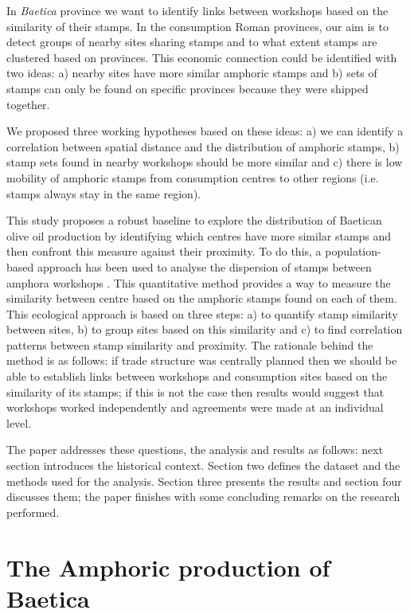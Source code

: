 In \textit{Baetica} province we want to identify links between workshops based on the similarity of their stamps. In the consumption Roman provinces, our aim is to detect groups of nearby sites sharing stamps and to what extent stamps are clustered based on provinces. This economic connection could be identified with two ideas: a) nearby sites have more similar amphoric stamps and b) sets of stamps can only be found on specific provinces because they were shipped together.

We proposed three working hypotheses based on these ideas: a) we can identify a correlation between spatial distance and the distribution of amphoric stamps, b) stamp sets found in nearby workshops should be more similar and c) there is low mobility of amphoric stamps from consumption centres to other regions (i.e. stamps always stay in the same region).

This study proposes a robust baseline to explore the distribution of Baetican olive oil production by identifying which centres have more similar stamps and then confront this measure against their proximity. To do this, a population-based approach has been used to analyse the dispersion of stamps between amphora workshops \citep{rubio-campillo_ecology_2018}. This quantitative method provides a way to measure the similarity between centre based on the amphoric stamps found on each of them. This ecological approach is based on three steps: a) to quantify stamp similarity between sites, b) to group sites based on this similarity and c) to find correlation patterns between stamp similarity and proximity. The rationale behind the method is as follows: if trade structure was centrally planned then we should be able to establish links between workshops and consumption sites based on the similarity of its stamps; if this is not the case then results would suggest that workshops worked independently and agreements were made at an individual level.

The paper addresses these questions, the analysis and results as follows: next section introduces the historical context. Section two defines the dataset and the methods used for the analysis. Section three presents the results and section four discusses them; the paper finishes with some concluding remarks on the research performed.

\section{The Amphoric production of Baetica}
\label{sec:1}

